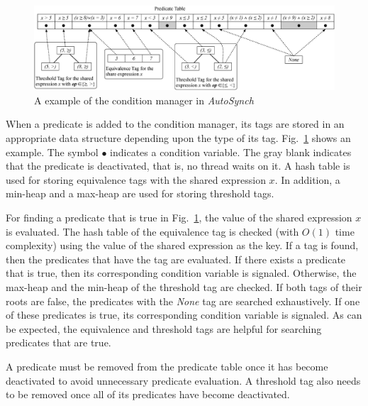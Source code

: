 \documentclass{sigplanconf}
\newtheorem{definition}{Definition}
\begin{document}
\begin{figure}[ht!]
  \centering
  \includegraphics[width=180mm]{fig/manager.eps}
  \caption{A example of the condition manager in {\em AutoSynch}}
  \label{fig:mgr}
\end{figure}


When a predicate is added to the condition manager, 
its tags are stored in an appropriate data structure depending upon the type of its tag.
Fig.~\ref{fig:mgr} shows an example. The symbol $\bullet$ indicates 
a condition variable. The gray blank indicates that the predicate is deactivated,
that is, no thread waits on it. A hash table is used for
storing equivalence tags with the shared expression $x$. In addition, 
a min-heap and a max-heap are used for storing threshold tags. 



For finding a predicate that is true in Fig.~\ref{fig:mgr}, the value of the
shared expression $x$ is evaluated. The hash table of the equivalence tag is 
checked (with $O(1)$ time complexity) using the value of the shared expression as the
key. If a tag is found, then the predicates that have the tag are evaluated. 
If there exists a predicate that is true, then its corresponding condition variable
is signaled. Otherwise, the max-heap and the min-heap of the threshold tag are 
checked. If both tags of their roots are false, the predicates with the {\em
None} tag are searched 
exhaustively. If one of these predicates is true, its corresponding condition 
variable is signaled. As can be expected, the equivalence and threshold tags 
are helpful for searching predicates that are true.   

A predicate must be removed from the predicate table once it has 
become deactivated to avoid unnecessary predicate evaluation. A threshold tag 
also needs to be removed once all of its predicates have become deactivated. 
\end{document}
